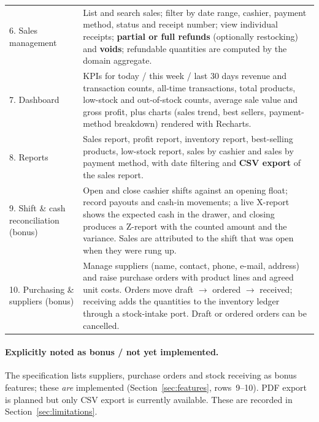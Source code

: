 \documentclass[11pt,a4paper]{article}
\begin{document}
\begin{longtable}{@{}p{}p{}@{}}
6. Sales management &
List and search sales; filter by date range, cashier, payment method, status and receipt number;
view individual receipts; \textbf{partial or full refunds} (optionally restocking) and \textbf{voids};
refundable quantities are computed by the domain aggregate. \\[2pt]

7. Dashboard &
KPIs for today / this week / last 30 days revenue and transaction counts, all-time transactions,
total products, low-stock and out-of-stock counts, average sale value and gross profit, plus
charts (sales trend, best sellers, payment-method breakdown) rendered with Recharts. \\[2pt]

8. Reports &
Sales report, profit report, inventory report, best-selling products, low-stock report, sales by
cashier and sales by payment method, with date filtering and \textbf{CSV export} of the sales
report. \\[2pt]

9. Shift \& cash reconciliation (bonus) &
Open and close cashier shifts against an opening float; record payouts and cash-in movements; a
live X-report shows the expected cash in the drawer, and closing produces a Z-report with the
counted amount and the variance. Sales are attributed to the shift that was open when they were
rung up. \\[2pt]

10. Purchasing \& suppliers (bonus) &
Manage suppliers (name, contact, phone, e-mail, address) and raise purchase orders with product
lines and agreed unit costs. Orders move draft $\rightarrow$ ordered $\rightarrow$ received;
receiving adds the quantities to the inventory ledger through a stock-intake port. Draft or
ordered orders can be cancelled. \\[2pt]

\bottomrule
\end{longtable}

\paragraph{Explicitly noted as bonus / not yet implemented.} The specification lists suppliers,
purchase orders and stock receiving as bonus features; these \emph{are} implemented
(Section~\ref{sec:features}, rows~9--10). PDF export is planned but
only CSV export is currently available. These are recorded in Section~\ref{sec:limitations}.
\end{document}
